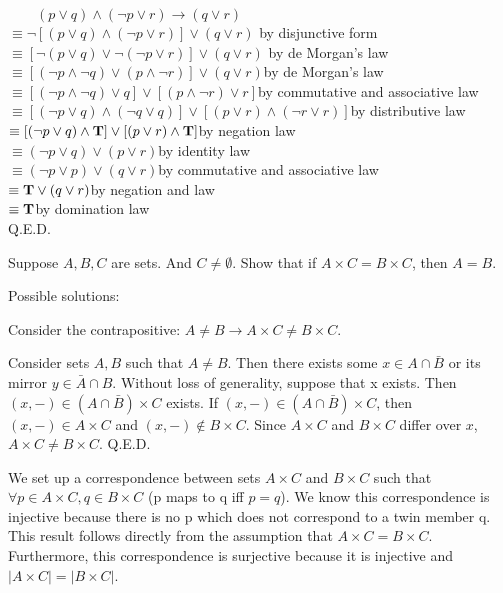 \documentclass[addpoints]{exam}
\begin{document}
\begin{questions}
  \begin{solution}
    \begin{center}
     $\qquad(p\vee q) \wedge (\neg p \vee r)\rightarrow (q \vee r)$\\$\equiv\neg [(p\vee q) \wedge (\neg p \vee r)]\vee (q \vee r)$ \hfill{by disjunctive form}\\$\equiv[\neg(p\vee q) \vee \neg(\neg p \vee r)]\vee (q \vee r)$ \hfill {by de Morgan's law}\\$\equiv[(\neg p\wedge\neg q) \vee (p \wedge\neg r)]\vee (q \vee r)$\hfill {by de Morgan's law}\\$\equiv[(\neg p\wedge\neg q)\vee q] \vee [(p \wedge\neg r)\vee r]$\hfill{by commutative and associative law}\\$\equiv[(\neg p\vee q)\wedge (\neg q\vee q)] \vee [(p\vee r)\wedge (\neg r\vee r)]$\hfill{by distributive law}\\$\equiv[(\neg p\vee q)\wedge {\bf{T}}] \vee [(p\vee r)\wedge {\bf{T}}]$\hfill{by negation law}\\$\equiv(\neg p\vee q) \vee (p\vee r)$\hfill{by identity law}\\$\equiv(\neg p\vee p) \vee (q\vee r)$\hfill{by commutative and associative law}\\$\equiv{\bf{T}}\vee (q\vee r)$\hfill{by negation and law}\\$\equiv{\bf{T}}$\hfill by domination law\\Q.E.D.\\
    \end{center}
  \end{solution}

\question[20] Suppose $A, B, C$ are sets. And $C \neq \emptyset$. Show that if $A \times C = B \times C$, then $A = B$.

  \begin{solution}
  Possible solutions:
    \begin{subparts}
    \subpart Consider the contrapositive: $A \not = B \rightarrow A \times C \not = B \times C$.

Consider sets $A, B$ such that $A \not= B$. Then there exists some $x \in A \cap \bar B$ or its mirror $y \in \bar A \cap B$. Without loss of generality, suppose that x exists. Then $(x,-) \in (A \cap \bar B) \times C$ exists. If $(x,-) \in (A \cap \bar B) \times C$, then $(x,-) \in A \times C$ and $(x,-) \not \in B \times C$. Since $A \times C$ and $B \times C$ differ over $x$, $A \times C \not = B \times C$. Q.E.D.

\subpart We set up a correspondence between sets $A \times C$ and $B \times C$ such that $\forall p \in A \times C, q \in B \times C$ (p maps to q iff $p = q$). We know this correspondence is injective because there is no p which does not correspond to a twin member q. This result follows directly from the assumption that $A \times C = B \times C$. Furthermore, this correspondence is surjective because it is injective and $|A \times C| = |B \times C|$. 


\end{subparts}
\end{solution}
\end{questions}
\end{document}
